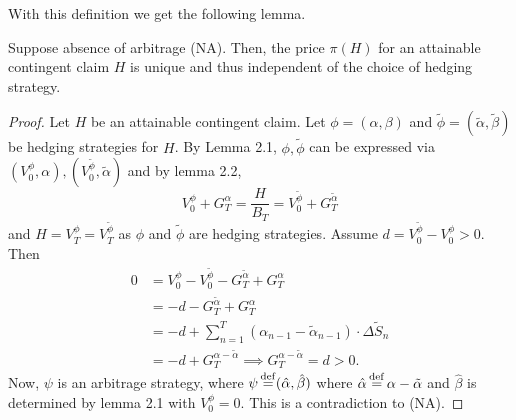 \documentclass[12pt]{amsart}
\begin{document}
With this definition we get the following lemma.

\begin{lemma}
    Suppose absence of arbitrage (NA). Then, the price \(\pi(H)\) for an attainable contingent claim \(H\) is unique and thus independent of the choice of hedging strategy.
\end{lemma}
\begin{proof}
    Let \(H\) be an attainable contingent claim. Let \(\phi = (\alpha, \beta)\) and \(\tilde{\phi} = (\tilde{\alpha}, \tilde{\beta})\) be hedging strategies for \(H\). By Lemma 2.1, \(\phi, \tilde{\phi}\) can be expressed via \((V_0^\phi, \alpha), (V_0^{\tilde{\phi}}, \tilde{\alpha})\) and by lemma 2.2, \[
        V_0^\phi + G_T^\alpha = \frac{H}{B_T} = V_0^{\tilde{\phi}} + G_T^{\tilde{\alpha}}
    \]
    and \(H = V_T^\phi = V_T^{\tilde{\phi}}\) as \(\phi\) and \(\tilde{\phi}\) are hedging strategies. Assume \(d = V_0^{\tilde{\phi}} - V_0^\phi > 0\). Then
    \begin{align*}
        0
        &= V_0^\phi - V_0^{\tilde{\phi}} - G_T^{\tilde{\alpha}} + G_T^\alpha\\
        &= -d - G_T^{\tilde{\alpha}} + G_T^{\alpha}\\
        &= -d + \sum_{n=1}^T \left( \alpha_{n-1} - \tilde{\alpha}_{n-1} \right) \cdot \Delta \tilde{S}_{n}\\
        &= -d + G_T^{\alpha-\tilde \alpha} \implies G_T^{\alpha - \tilde \alpha} = d > 0.
    \end{align*}
    Now, \(\psi\) is an arbitrage strategy, where \(\psi \operatorname*{\stackrel{\operatorname{def}}{=}} (\hat{\alpha}, \hat{\beta})\) where \(\hat{\alpha} \operatorname*{\stackrel{\operatorname{def}}{=}} \alpha - \tilde{\alpha}\) and \(\hat{\beta}\) is determined by lemma 2.1 with \(V_0^\phi = 0\). This is a contradiction to (NA).
\end{proof}
\end{document}
